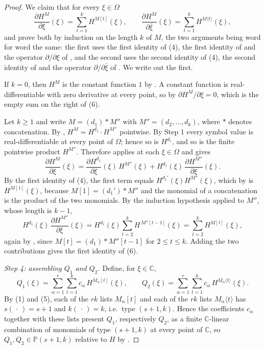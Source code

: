 \begin{proof}
We claim that for every $\xi\in\Omega$
\begin{equation}\tag{6}
  \frac{\partial H^{M}}{\partial\xi}(\xi)=\sum_{t=1}^{k}H^{M[t]}(\xi),
  \qquad
  \frac{\partial H^{M}}{\partial\bar\xi}(\xi)=\sum_{t=1}^{k}H^{M\langle t\rangle}(\xi),
\end{equation}
and prove both by induction on the length $k$ of $M$, the two arguments being
word for word the same: the first uses the first identity of (4), the first
identity of  and the operator
$\partial/\partial\xi$ of , and the second uses the second
identity of (4), the second identity of  and the
operator $\partial/\partial\bar\xi$ of .  We write out the
first.

If $k=0$, then $H^{M}$ is the constant function $1$ by
.  A constant function is real-differentiable with zero
derivative at every point, so by 
$\partial H^{M}/\partial\xi=0$, which is the empty sum on the right of (6).

Let $k\ge1$ and write $M=(d_1)*M''$ with $M''=(d_2,\dots,d_k)$, where $*$
denotes concatenation.  By ,
$H^{M}=H^{d_1}\cdot H^{M''}$ pointwise.  By Step 1 every symbol value is
real-differentiable at every point of $\Omega$; hence so is $H^{d_1}$, and so
is the finite pointwise product $H^{M''}$.  Therefore
 applies at each $\xi\in\Omega$ and gives
\[
  \frac{\partial H^{M}}{\partial\xi}(\xi)
  =\frac{\partial H^{d_1}}{\partial\xi}(\xi)\,H^{M''}(\xi)
   +H^{d_1}(\xi)\,\frac{\partial H^{M''}}{\partial\xi}(\xi).
\]
By the first identity of (4), the first term equals
$H^{d_1'}(\xi)H^{M''}(\xi)$, which by  is
$H^{M[1]}(\xi)$, because $M[1]=(d_1')*M''$ and the monomial of a concatenation
is the product of the two monomials.  By the induction hypothesis applied to
$M''$, whose length is $k-1$,
\[
  H^{d_1}(\xi)\,\frac{\partial H^{M''}}{\partial\xi}(\xi)
  =H^{d_1}(\xi)\sum_{t=2}^{k}H^{\,M''[t-1]}(\xi)
  =\sum_{t=2}^{k}H^{M[t]}(\xi),
\]
again by , since $M[t]=(d_1)*M''[t-1]$ for
$2\le t\le k$.  Adding the two contributions gives the first identity of (6).

\emph{Step 4: assembling $Q_1$ and $Q_2$.}  Define, for $\xi\in\mathbb{C}$,
\[
  Q_1(\xi)=\sum_{\alpha=1}^{r}\sum_{t=1}^{k}c_\alpha\,H^{M_\alpha[t]}(\xi),
  \qquad
  Q_2(\xi)=\sum_{\alpha=1}^{r}\sum_{t=1}^{k}c_\alpha\,H^{M_\alpha\langle t\rangle}(\xi).
\]
By (1) and (5), each of the $rk$ lists $M_\alpha[t]$ and each of the $rk$ lists
$M_\alpha\langle t\rangle$ has $s(\,\cdot\,)=s+1$ and $k(\,\cdot\,)=k$, i.e.\
type $(s+1,k)$.  Hence the coefficients $c_\alpha$ together with these lists
present $Q_1$, respectively $Q_2$, as a finite $\mathbb{C}$-linear combination
of monomials of type $(s+1,k)$ at every point of $\mathbb{C}$, so
$Q_1,Q_2\in\mathbb{P}(s+1,k)$ relative to $H$ by \noderef{PClass}.


\end{proof}

